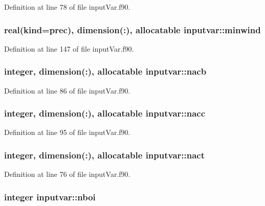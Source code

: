 Definition at line 78 of file input\-Var.\-f90.

\hypertarget{classinputvar_abb9cb8ca38b7592b52f30836a6755584}{
\subsubsection[{minwind}]{\setlength{\rightskip}{0pt plus 5cm}real(kind=prec), dimension(\-:), allocatable inputvar\-::minwind}}\label{classinputvar_abb9cb8ca38b7592b52f30836a6755584}


Definition at line 147 of file input\-Var.\-f90.

\hypertarget{classinputvar_ae517f545e388b4352b7941203efa8449}{
\subsubsection[{nacb}]{\setlength{\rightskip}{0pt plus 5cm}integer, dimension(\-:), allocatable inputvar\-::nacb}}\label{classinputvar_ae517f545e388b4352b7941203efa8449}


Definition at line 86 of file input\-Var.\-f90.

\hypertarget{classinputvar_a8e4bb497a3825e6f554e3268dd2bbd63}{
\subsubsection[{nacc}]{\setlength{\rightskip}{0pt plus 5cm}integer, dimension(\-:), allocatable inputvar\-::nacc}}\label{classinputvar_a8e4bb497a3825e6f554e3268dd2bbd63}


Definition at line 95 of file input\-Var.\-f90.

\hypertarget{classinputvar_aecb7a7ef500aee2174166b23b5c72e2a}{
\subsubsection[{nact}]{\setlength{\rightskip}{0pt plus 5cm}integer, dimension(\-:), allocatable inputvar\-::nact}}\label{classinputvar_aecb7a7ef500aee2174166b23b5c72e2a}


Definition at line 76 of file input\-Var.\-f90.

\hypertarget{classinputvar_a168bc1dcb73e68b3620991b6494f3797}{
\subsubsection[{nboi}]{\setlength{\rightskip}{0pt plus 5cm}integer inputvar\-::nboi}}\label{classinputvar_a168bc1dcb73e68b3620991b6494f3797}


